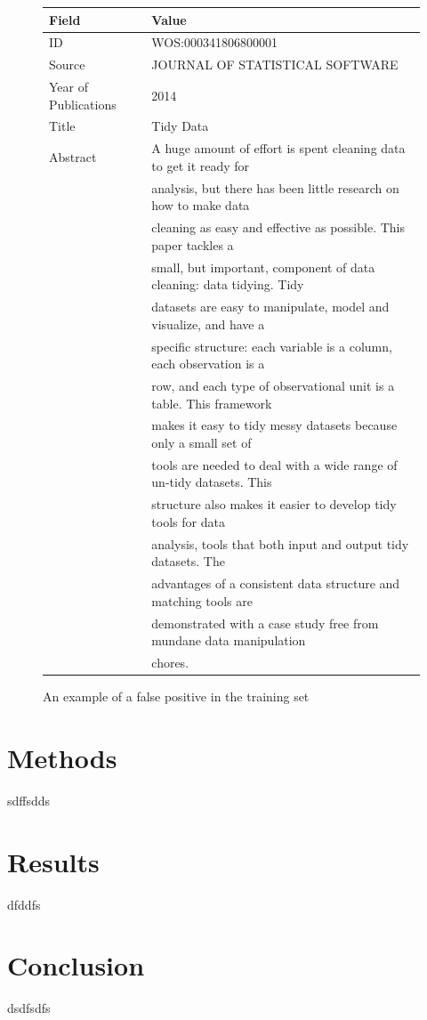 \documentclass[12pt, a4paper]{article}
\begin{document}
\begin{figure}[H]
	\begin{tabular}{ll}
		\toprule
		Field & Value\\
		\midrule
		ID & WOS:000341806800001 \\
		Source & JOURNAL OF STATISTICAL SOFTWARE \\
		Year of Publications & 2014 \\
		Title & Tidy Data \\
		Abstract &  A huge amount of effort is spent cleaning data to get it ready for\\
		&analysis, but there has been little research on how to make data\\
		&cleaning as easy and effective as possible. This paper tackles a\\
		&small, but important, component of data cleaning: data tidying. Tidy\\
		&datasets are easy to manipulate, model and visualize, and have a\\
		&specific structure: each variable is a column, each observation is a\\
		&row, and each type of observational unit is a table. This framework\\
		&makes it easy to tidy messy datasets because only a small set of\\
		&tools are needed to deal with a wide range of un-tidy datasets. This\\
		&structure also makes it easier to develop tidy tools for data\\
		&analysis, tools that both input and output tidy datasets. The\\
		&advantages of a consistent data structure and matching tools are\\
		&demonstrated with a case study free from mundane data manipulation\\
		&chores. \\
		\bottomrule
	\end{tabular}
	\caption{An example of a false positive in the training set}\label{badPos}
\end{figure}

\section{Methods}
sdffsdds
\section{Results}
dfddfs
\section{Conclusion}
dsdfsdfs
\newpage
{}
%

\end{document}
